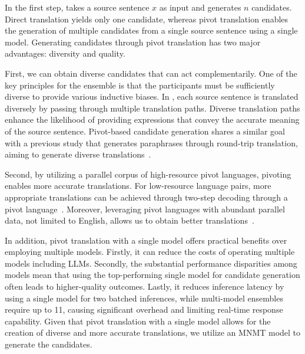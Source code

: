 In the first step, \ours takes a source sentence $x$ as input and generates $n$ candidates.
Direct translation yields only one candidate, whereas pivot translation enables the generation of multiple candidates from a single source sentence using a single model.
Generating candidates through pivot translation has two major advantages: diversity and quality.


First, we can obtain diverse candidates that can act complementarily.
One of the key principles for the ensemble is that the participants must be sufficiently diverse to provide various inductive biases.
In \ours, each source sentence is translated diversely by passing through multiple translation paths.
Diverse translation paths enhance the likelihood of providing expressions that convey the accurate meaning of the source sentence.
Pivot-based candidate generation shares a similar goal with a previous study that generates paraphrases through round-trip translation, aiming to generate diverse translations~\cite{thompson-post-2020-paraphrase}.


Second, by utilizing a parallel corpus of high-resource pivot languages, pivoting enables more accurate translations.
For low-resource language pairs, more appropriate translations can be achieved through two-step decoding through a pivot language~\cite{he-etal-2022-tencent}.
Moreover, leveraging pivot languages with abundant parallel data, not limited to English, allows us to obtain better translations~\cite{paul2009importance, dabre-etal-2015-leveraging}.


In addition, pivot translation with a single model offers practical benefits over employing multiple models. 
Firstly, it can reduce the costs of operating multiple models including LLMs. 
Secondly, the substantial performance disparities among models mean that using the top-performing single model for candidate generation often leads to higher-quality outcomes. 
Lastly, it reduces inference latency by using a single model for two batched inferences, while multi-model ensembles require up to 11, causing significant overhead and limiting real-time response capability.
Given that pivot translation with a single model allows for the creation of diverse and more accurate translations, we utilize an MNMT model to generate the candidates.


